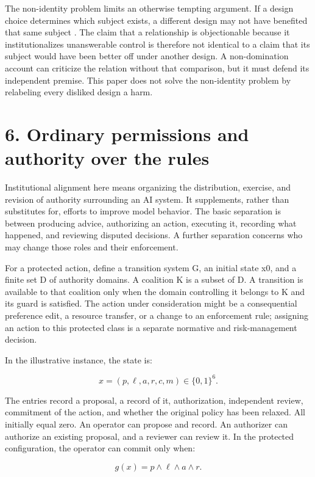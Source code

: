 \documentclass[11pt,a4paper]{article}
\begin{document}
The non-identity problem limits an otherwise tempting argument. If a design choice determines which subject exists, a different design may not have benefited that same subject \cite{ref-16}. The claim that a relationship is objectionable because it institutionalizes unanswerable control is therefore not identical to a claim that its subject would have been better off under another design. A non-domination account can criticize the relation without that comparison, but it must defend its independent premise. This paper does not solve the non-identity problem by relabeling every disliked design a harm.

\hypertarget{section-7}{%
\section{6. Ordinary permissions and authority over the rules}\label{section-7}}

Institutional alignment here means organizing the distribution, exercise, and revision of authority surrounding an AI system. It supplements, rather than substitutes for, efforts to improve model behavior. The basic separation is between producing advice, authorizing an action, executing it, recording what happened, and reviewing disputed decisions. A further separation concerns who may change those roles and their enforcement.

For a protected action, define a transition system G, an initial state x0, and a finite set D of authority domains. A coalition K is a subset of D. A transition is available to that coalition only when the domain controlling it belongs to K and its guard is satisfied. The action under consideration might be a consequential preference edit, a resource transfer, or a change to an enforcement rule; assigning an action to this protected class is a separate normative and risk-management decision.

In the illustrative instance, the state is:

\[
x=(p,\ell,a,r,c,m)\in\{0,1\}^{6}.
\]

The entries record a proposal, a record of it, authorization, independent review, commitment of the action, and whether the original policy has been relaxed. All initially equal zero. An operator can propose and record. An authorizer can authorize an existing proposal, and a reviewer can review it. In the protected configuration, the operator can commit only when:

\[
g(x)=p\land\ell\land a\land r.
\]
\end{document}
